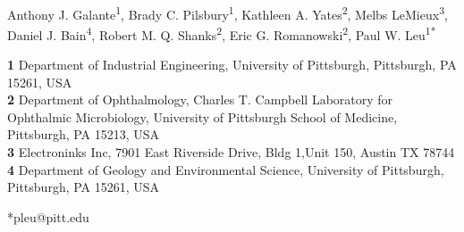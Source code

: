 \documentclass[10pt,letterpaper]{article}
\begin{document}
\vspace*{0.2in}

\begin{flushleft}
{\Large
\textbf{} %
}
\newline
\\
Anthony J. Galante\textsuperscript{1},
Brady C. Pilsbury\textsuperscript{1},
Kathleen A. Yates\textsuperscript{2},
Melbs LeMieux\textsuperscript{3},
Daniel J. Bain\textsuperscript{4},
Robert M. Q. Shanks\textsuperscript{2},
Eric G. Romanowski\textsuperscript{2},
Paul W. Leu\textsuperscript{1*}


\bigskip
\textbf{1} Department of Industrial Engineering, University of Pittsburgh, Pittsburgh, PA 15261, USA
\\
\textbf{2} Department of Ophthalmology, Charles T. Campbell Laboratory for Ophthalmic Microbiology, University of Pittsburgh School of Medicine, Pittsburgh, PA 15213, USA
\\
\textbf{3} Electroninks Inc, 7901 East Riverside Drive, Bldg 1,Unit 150, Austin TX  78744
\\
\textbf{4} Department of Geology and Environmental Science, University of Pittsburgh, Pittsburgh, PA 15261, USA
\bigskip

*pleu@pitt.edu




\end{flushleft}
\end{document}
